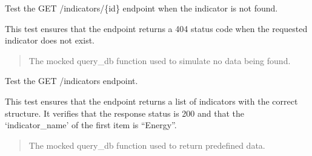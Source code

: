 \documentclass[letterpaper,10pt,english]{sphinxmanual}
\begin{document}

\begin{fulllineitems}
\label{\detokenize{test.my_fastapi:test.my_fastapi.test_main.test_get_indicator_not_found}}
\pysigstartsignatures
\pysiglinewithargsret
{}
{}
{}
\pysigstopsignatures
\sphinxAtStartPar
Test the GET /indicators/\{id\} endpoint when the indicator is not found.

\sphinxAtStartPar
This test ensures that the endpoint returns a 404 status code when the requested indicator does not exist.
\begin{quote}\begin{description}
\sphinxAtStartPar
{} \textendash{} The mocked query\_db function used to simulate no data being found.

\end{description}\end{quote}

\end{fulllineitems}


\begin{fulllineitems}
\label{\detokenize{test.my_fastapi:test.my_fastapi.test_main.test_get_indicators}}
\pysigstartsignatures
\pysiglinewithargsret
{}
{}
{}
\pysigstopsignatures
\sphinxAtStartPar
Test the GET /indicators endpoint.

\sphinxAtStartPar
This test ensures that the endpoint returns a list of indicators with the correct structure.
It verifies that the response status is 200 and that the ‘indicator\_name’ of the first item is “Energy”.
\begin{quote}\begin{description}
\sphinxAtStartPar
{} \textendash{} The mocked query\_db function used to return predefined data.

\end{description}\end{quote}

\end{fulllineitems}
\end{document}

